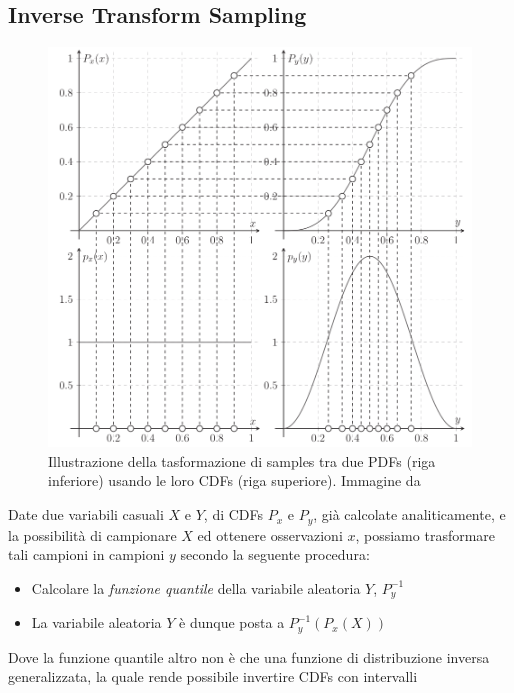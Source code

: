 \subsection{Inverse Transform Sampling}\label{chapter6:sampling:inverseTransformSection}
\begin{figure}[tb]
	\centering
	\includegraphics[width=0.9\linewidth]{../assets/chapter6_sampling_inverse_transform_sampling.png}
	\caption{Illustrazione della tasformazione di samples tra due PDFs (riga inferiore) usando le loro CDFs (riga superiore). Immagine da 
		\cite{pegoraro}}
	\label{chapter6:sampling:inverseTransform}
\end{figure}
Date due variabili casuali $X$ e $Y$, di CDFs\footnotemark{} $P_x$ e $P_y$, gi\`a calcolate analiticamente, e la possibilit\`a di campionare $X$ ed 
ottenere 
osservazioni $x$, possiamo trasformare tali campioni in campioni $y$ secondo la seguente procedura:\par
\begin{itemize}[topsep=0pt,noitemsep]
	\item Calcolare la \textit{funzione quantile} della variabile aleatoria $Y$, $P_y^{-1}$
	\item La variabile aleatoria $Y$ \`e dunque posta a $P_y^{-1}(P_x(X))$
\end{itemize}
Dove la funzione quantile altro non \`e che una funzione di distribuzione inversa generalizzata, la quale rende possibile invertire CDFs con intervalli
